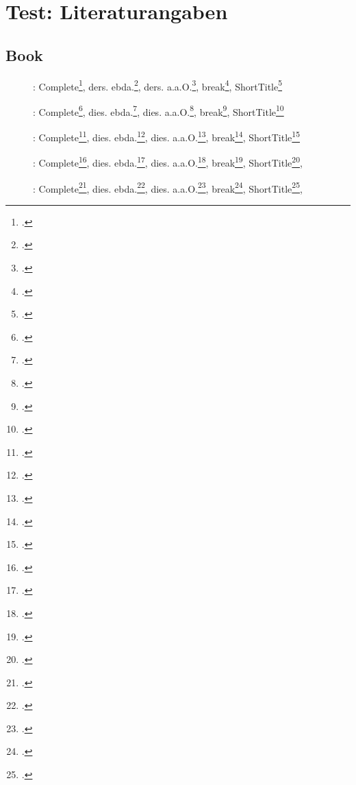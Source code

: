 \documentclass[
  DIV=calc,i
  BCOR=5mm,
  11pt,
  headings=small,
  oneside,
  abstract=true,
  toc=bib,
  english,ngerman]{scrartcl}
\begin{document}
\section{Test: Literaturangaben}
\subsection{Book}
\begin{description}
  \item[\mars]: Complete\footcite[vgl.][15]{B12020a}, ders. ebda.\footcite[vgl.][15]{B12020a}, ders. a.a.O.\footcite[vgl.][23]{B12020a}, break\footcite[vgl.][15]{BR2020a}, ShortTitle\footcite[vgl.][15]{B12020a}
  \item[\female]: Complete\footcite[vgl.][15]{B22020a}, dies. ebda.\footcite[vgl.][15]{B22020a}, dies. a.a.O.\footcite[vgl.][23]{B22020a}, break\footcite[vgl.][15]{BR2020a}, ShortTitle\footcite[vgl.][15]{B22020a}
  \item[\mars\mars]: Complete\footcite[vgl.][15]{B32020a}, dies. ebda.\footcite[vgl.][15]{B32020a}, dies. a.a.O.\footcite[vgl.][23]{B32020a}, break\footcite[vgl.][15]{BR2020a}, ShortTitle\footcite[vgl.][15]{B32020a}
  \item[\female\female]: Complete\footcite[vgl.][15]{B42020a}, dies. ebda.\footcite[vgl.][15]{B42020a}, dies. a.a.O.\footcite[vgl.][23]{B42020a}, break\footcite[vgl.][15]{BR2020a}, ShortTitle\footcite[vgl.][15]{B42020a},
  \item[\female\mars]: Complete\footcite[vgl.][15]{B52020a}, dies. ebda.\footcite[vgl.][15]{B52020a}, dies. a.a.O.\footcite[vgl.][23]{B52020a}, break\footcite[vgl.][15]{BR2020a}, ShortTitle\footcite[vgl.][15]{B52020a},
\end{description}
\end{document}
